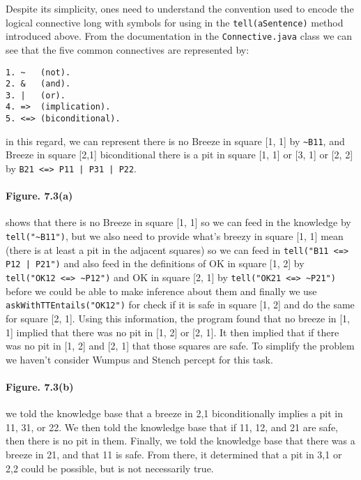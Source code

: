 \documentclass[a4paper]{report}
\begin{document}
Despite its simplicity, ones need to understand the convention used to encode the logical connective long with symbols for using in the \texttt{tell(aSentence)} method introduced above. From the documentation in the \texttt{Connective.java} class we can see that the five common connectives are represented by: 

\begin{verbatim}
1. ~   (not).
2. &   (and).
3. |   (or).
4. =>  (implication).
5. <=> (biconditional).
\end{verbatim}

\noindent in this regard, we can represent there is no Breeze in square [1, 1] by \texttt{\textasciitilde{}B11}, and Breeze in square [2,1] biconditional there is a pit in square [1, 1] or [3, 1] or [2, 2] by \texttt{B21 <=> P11 | P31 | P22}.

\paragraph{Figure. 7.3(a) } shows that there is no Breeze in square [1, 1] so we can feed in the knowledge by \texttt{tell("\textasciitilde{}B11")}, but we also need to provide what's breezy in square [1, 1] mean (there is at least a pit in the adjacent squares) so we can feed in \texttt{tell("B11 <=> P12 | P21")} and also feed in the definitions of OK in square [1, 2] by  \texttt{tell("OK12 <=> \textasciitilde{}P12")} and OK in square [2, 1] by \texttt{tell("OK21 <=> \textasciitilde{}P21")} before we could be able to make inference about them and finally we use \texttt{askWithTTEntails("OK12")} for check if it is safe in square [1, 2] and do the same for square [2, 1]. Using this information, the program found that no breeze in [1, 1] implied that there was no pit in [1, 2] or [2, 1]. It then implied that if there was no pit in [1, 2] and [2, 1] that those squares are safe. To simplify the problem we haven't consider Wumpus and Stench percept for this task. \\

\paragraph{Figure. 7.3(b) } we told the knowledge base that a breeze in 2,1 biconditionally implies a pit in 11, 31, or 22. We then told the knowledge base that if 11, 12, and 21 are safe, then there is no pit in them. Finally, we told the knowledge base that there was a breeze in 21, and that 11 is safe. From there, it determined that a pit in 3,1 or 2,2 could be possible, but is not necessarily true. \\
\end{document}
